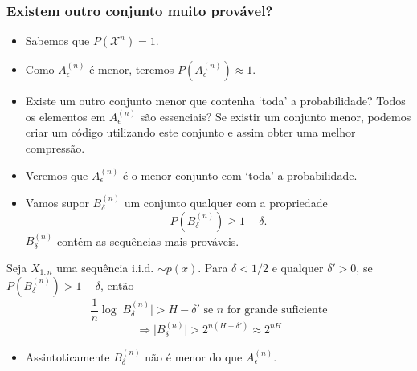 \begin{frame}[allowframebreaks]
  \frametitle{Existem outro conjunto muito provável?}
  \begin{itemize}
  \item Sabemos que $P(\mathcal{X}^n)=1$.
  \item Como $A_{\epsilon}^{(n)}$ é menor, teremos $P(A_{\epsilon}^{(n)}) \approx 1$.
  \item Existe um outro conjunto menor que contenha `toda' a probabilidade? Todos os elementos em $A_{\epsilon}^{(n)}$ 
        são essenciais? Se existir um conjunto menor, 
        podemos criar um código utilizando este conjunto e assim obter uma melhor compressão.
  \item Veremos que $A_{\epsilon}^{(n)}$ é o menor conjunto com `toda' a probabilidade.
  \end{itemize}

  \framebreak

  \begin{itemize}
  \item Vamos supor $B_{\delta}^{(n)}$ um conjunto qualquer com a propriedade
        \begin{equation}
        P(B_{\delta}^{(n)}) \geq 1 - \delta .
        \end{equation}
        $B_{\delta}^{(n)}$ contém as sequências mais prováveis.
  \end{itemize}

  \begin{theorem}
  Seja $X_{1:n}$ uma sequência i.i.d. $\sim p(x)$. Para $\delta < 1/2$ e qualquer $\delta' > 0$,
  se $P(B_{\delta}^{(n)}) > 1 - \delta$, então
        \begin{equation}
        \frac{1}{n} \log \vert B_{\delta}^{(n)} \vert >  H - \delta' \text{ se } n \text{ for grande suficiente}
        \end{equation}
        \begin{equation}
        \Rightarrow \vert B_{\delta}^{(n)} \vert > 2^{n(H-\delta')} \approx 2^{nH}
        \end{equation}
  \end{theorem}
  \begin{itemize}
  \item Assintoticamente $B_{\delta}^{(n)}$ não é menor do que $A_{\epsilon}^{(n)}$.
  \end{itemize}

  \framebreak


\end{frame}
